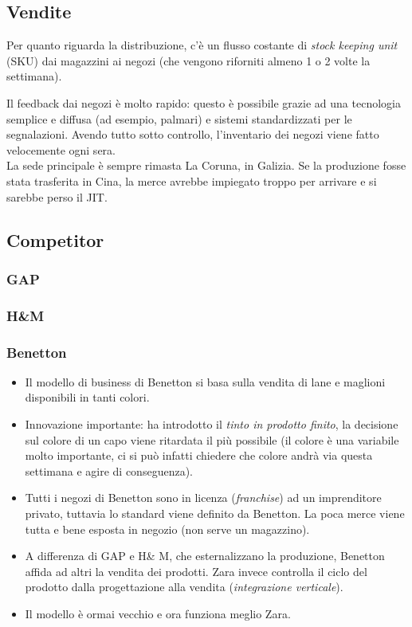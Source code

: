 \documentclass[a4paper,portrait,12pt]{article}
\theoremstyle{definition}
\begin{document}
\subsection{Vendite}

Per quanto riguarda la distribuzione, c'è un flusso costante di \emph{stock keeping unit} (SKU) dai magazzini ai negozi (che vengono riforniti almeno 1 o 2 volte la settimana).

Il feedback dai negozi è molto rapido: questo è possibile grazie ad una tecnologia semplice e diffusa (ad esempio, palmari) e sistemi standardizzati per le segnalazioni.
Avendo tutto sotto controllo, l'inventario dei negozi viene fatto velocemente ogni sera.\\


La sede principale è sempre rimasta La Coruna, in Galizia.
Se la produzione fosse stata trasferita in Cina, la merce avrebbe impiegato troppo per arrivare e si sarebbe perso il JIT.

\subsection{Competitor}

\subsubsection{GAP}

\subsubsection{H\&M}

\subsubsection{Benetton}
\begin{itemize}
\item Il modello di business di Benetton si basa sulla vendita di lane e maglioni disponibili in tanti colori.
\item Innovazione importante: ha introdotto il \emph{tinto in prodotto finito}, la decisione sul colore di un capo viene ritardata il più possibile (il colore è una variabile molto importante, ci si può infatti chiedere che colore andrà via questa settimana e agire di conseguenza).
\item Tutti i negozi di Benetton sono in licenza (\emph{franchise}) ad un imprenditore privato, tuttavia lo standard viene definito da Benetton.
La poca merce viene tutta e bene esposta in negozio (non serve un magazzino).
\item A differenza di GAP e H\& M, che esternalizzano la produzione, Benetton affida ad altri la vendita dei prodotti.
Zara invece controlla il ciclo del prodotto dalla progettazione alla vendita (\emph{integrazione verticale}).
\item Il modello è ormai vecchio e ora funziona meglio Zara.
\end{itemize}
\end{document}
